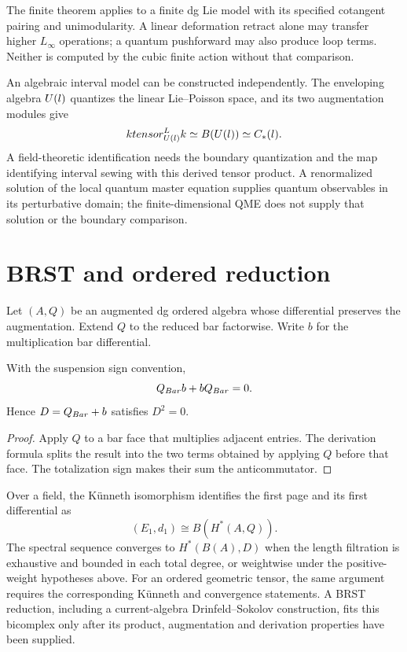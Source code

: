 The finite theorem applies to a finite dg Lie model with its specified
cotangent pairing and unimodularity. A linear deformation retract alone may
transfer higher $L_\infty$ operations; a quantum pushforward may also produce
loop terms. Neither is computed by the cubic finite action without that comparison.

An algebraic interval model can be constructed independently.
The enveloping algebra $U(l)$ quantizes the linear Lie--Poisson space,
and its two augmentation modules give
\[
 ktensor_{U(l)}^{L}k
 \simeq B(U(l))\simeq C_*(l).
\]
A field-theoretic identification needs the boundary quantization and the map
identifying interval sewing with this derived tensor product.
A renormalized solution of the local quantum master equation supplies quantum
observables in its perturbative domain; the finite-dimensional QME does not
supply that solution or the boundary comparison.

\section{BRST and ordered reduction}
Let $(A,Q)$ be an augmented dg ordered algebra whose differential preserves
the augmentation. Extend $Q$ to the reduced bar factorwise. Write $b$ for
the multiplication bar differential.

\begin{proposition}
With the suspension sign convention,
\[
 Q_{Bar}b+bQ_{Bar}=0.
\]
Hence $D=Q_{Bar}+b$ satisfies $D^2=0$.
\end{proposition}
\begin{proof}
Apply $Q$ to a bar face that multiplies adjacent entries. The derivation formula splits the result into the two terms obtained by applying $Q$ before that face. The totalization sign makes their sum the anticommutator.
\end{proof}

Over a field, the K\"unneth isomorphism identifies the first page and its
first differential as
\[
 (E_1,d_1)\cong B(H^*(A,Q)).
\]
The spectral sequence converges to $H^*(B(A),D)$ when the length filtration
is exhaustive and bounded in each total degree, or weightwise under the
positive-weight hypotheses above. For an ordered geometric tensor, the same
argument requires the corresponding K\"unneth and convergence statements.
A BRST reduction, including a current-algebra Drinfeld--Sokolov construction,
fits this bicomplex only after its product, augmentation and derivation
properties have been supplied.

